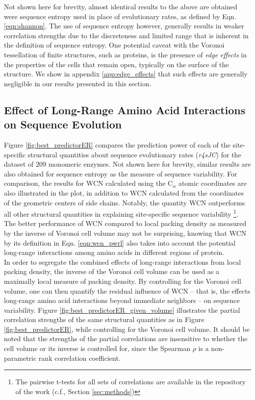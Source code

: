 \documentclass[11pt]{article}
\begin{document}
    Not shown here for brevity, almost identical results to the above are obtained were sequence entropy used in place of evolutionary rates, as defined by Eqn. \ref{eqn:shannon}. The use of sequence entropy however, generally results in weaker correlation strengths due to the discreteness and limited range that is inherent in the definition of sequence entropy. One potential caveat with the Voronoi tessellation of finite structures, such as proteins, is the presence of {\it edge effects} in the properties of the cells that remain open, typically on the surface of the structure. We show in appendix \ref{app:edge_effects} that such effects are generally negligible in our results presented in this section. \\

    \subsection*{Effect of Long-Range Amino Acid Interactions on Sequence Evolution}
    \label{sec:long_range}
    Figure \ref{fig:best_predictorER} compares the prediction power of each of the site-specific structural quantities about sequence evolutionary rates ({\it r4sJC}) for the dataset of $209$ monomeric enzymes. Not shown here for brevity, similar results are also obtained for sequence entropy as the measure of sequence variability. For comparison, the results for WCN calculated using the C$_\alpha$ atomic coordinates are also illustrated in the plot, in addition to WCN calculated from the coordinates of the geometric centers of side chains. Notably, the quantity WCN outperforms all other structural quantities in explaining site-specific sequence variability \footnote{The pairwise t-tests for all sets of correlations are available in the repository of the work (c.f., Section \ref{sec:methods})}. The better performance of WCN compared to local packing density as measured by the inverse of Voronoi cell volume may not be surprising, knowing that WCN by its definition in Eqn. \ref{eqn:wcn_pwrl} also takes into account the potential long-range interactions among amino acids in different regions of protein. \\

    In order to segregate the combined effects of long-range interactions from local packing density, the inverse of the Voronoi cell volume can be used as a maximally local measure of packing density. By controlling for the Voronoi cell volume, one can then quantify the residual influence of WCN -- that is, the effects long-range amino acid interactions beyond immediate neighbors -- on sequence variability. Figure \ref{fig:best_predictorER_given_volume} illustrates the partial correlation strengths of the same structural quantities as in Figure \ref{fig:best_predictorER}, while controlling for the Voronoi cell volume. It should be noted that the strengths of the partial correlations are insensitive to whether the cell volume or its inverse is controlled for, since the Spearman $\rho$ is a non-parametric rank correlation coefficient.
\end{document}
